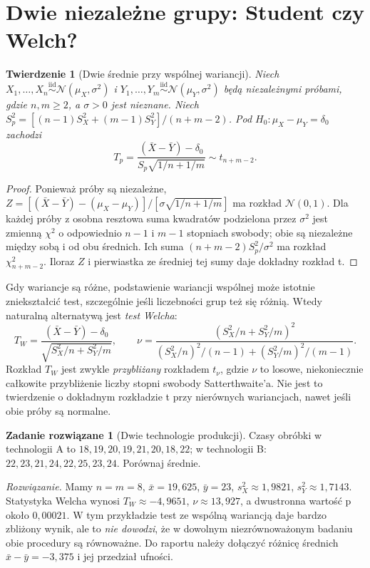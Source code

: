 \documentclass[11pt,a4paper,oneside]{report}
\numberwithin{equation}{chapter}
\theoremstyle{plain}
\newtheorem{twierdzenie}{Twierdzenie}[chapter]
\theoremstyle{definition}
\newtheorem{zadanie}{Zadanie rozwiązane}[chapter]
\theoremstyle{remark}
\newcommand{\Normal}{\mathcal N}
\newcommand{\iid}{\mathrel{\overset{\mathrm{iid}}\sim}}
\begin{document}
\section{Dwie niezależne grupy: Student czy Welch?}
\begin{twierdzenie}[Dwie średnie przy wspólnej wariancji]
\label{thm:two-sample-t}
Niech $X_1,\ldots,X_n\iid\Normal(\mu_X,\sigma^2)$ i
$Y_1,\ldots,Y_m\iid\Normal(\mu_Y,\sigma^2)$ będą niezależnymi
próbami, gdzie $n,m\ge2$, a $\sigma>0$ jest nieznane.
Niech
$S_p^2=[(n-1)S_X^2+(m-1)S_Y^2]/(n+m-2)$.
Pod $H_0:\mu_X-\mu_Y=\delta_0$ zachodzi
\[
 T_p=\frac{(\bar X-\bar Y)-\delta_0}
 {S_p\sqrt{1/n+1/m}}\sim t_{n+m-2}.
\]
\end{twierdzenie}
\begin{proof}
Ponieważ próby są niezależne,
$Z=[(\bar X-\bar Y)-(\mu_X-\mu_Y)]/
[\sigma\sqrt{1/n+1/m}]$ ma rozkład $\Normal(0,1)$.
Dla każdej próby z osobna resztowa suma kwadratów podzielona
przez $\sigma^2$ jest zmienną $\chi^2$ o odpowiednio
$n-1$ i $m-1$ stopniach swobody; obie są niezależne
między sobą i od obu średnich. Ich suma
$(n+m-2)S_p^2/\sigma^2$ ma rozkład
$\chi^2_{n+m-2}$. Iloraz $Z$ i pierwiastka ze
średniej tej sumy daje dokładny rozkład t.
\end{proof}

Gdy wariancje są różne, podstawienie wariancji wspólnej
może istotnie zniekształcić test, szczególnie jeśli
liczebności grup też się różnią. Wtedy naturalną alternatywą
jest \emph{test Welcha}:
\[
 T_W=\frac{(\bar X-\bar Y)-\delta_0}
 {\sqrt{S_X^2/n+S_Y^2/m}},\qquad
 \nu=\frac{(S_X^2/n+S_Y^2/m)^2}
 {(S_X^2/n)^2/(n-1)+(S_Y^2/m)^2/(m-1)}.
\]
Rozkład $T_W$ jest zwykle \emph{przybliżany} rozkładem
$t_\nu$, gdzie $\nu$ to losowe, niekoniecznie całkowite
przybliżenie liczby stopni swobody Satterthwaite'a.
Nie jest to twierdzenie o dokładnym rozkładzie t przy
nierównych wariancjach, nawet jeśli obie próby są normalne.

\begin{zadanie}[Dwie technologie produkcji]\label{zad:welch-case}
Czasy obróbki w technologii A to
$18,19,20,19,21,20,18,22$; w technologii B:
$22,23,21,24,22,25,23,24$. Porównaj średnie.
\par\emph{Rozwiązanie.} Mamy $n=m=8$,
$\bar x=19{,}625$, $\bar y=23$, $s_X^2\approx1{,}9821$,
$s_Y^2\approx1{,}7143$. Statystyka Welcha wynosi
$T_W\approx-4{,}9651$, $\nu\approx13{,}927$,
a dwustronna wartość p około $0{,}00021$.
W tym przykładzie test ze wspólną wariancją daje bardzo
zbliżony wynik, ale to \emph{nie dowodzi}, że w dowolnym
niezrównoważonym badaniu obie procedury są równoważne.
Do raportu należy dołączyć różnicę średnich
$\bar x-\bar y=-3{,}375$ i jej przedział ufności.
\end{zadanie}
\end{document}
